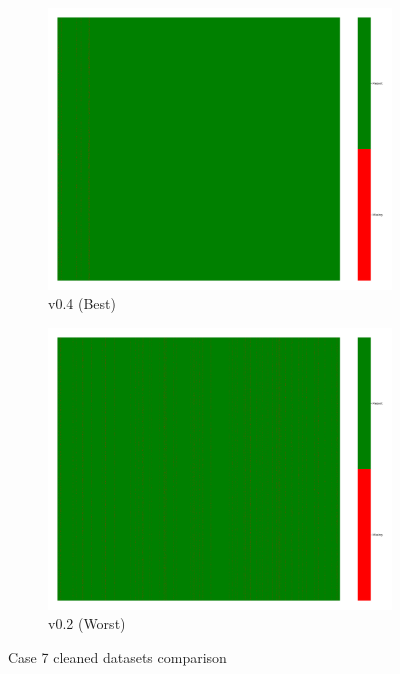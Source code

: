 \documentclass[a4paper,12pt]{article}
\begin{document}
\begin{figure}[H]
    \centering
    \begin{subfigure}{0.45\textwidth}
        \includegraphics[width=\linewidth]{case8_v0.4_heatmap_cleaned.png}
        \caption{v0.4 (Best)}
    \end{subfigure}
    \hfill
    \begin{subfigure}{0.45\textwidth}
        \includegraphics[width=\linewidth]{case8_v0.2_heatmap_cleaned.png}
        \caption{v0.2 (Worst)}
    \end{subfigure}
    \caption{Case 7 cleaned datasets comparison}
\end{figure}
\end{document}
